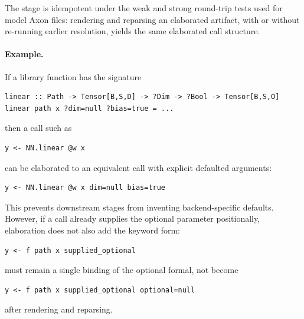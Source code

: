 The stage is idempotent under the weak and strong round-trip tests used for
model Axon files: rendering and reparsing an elaborated artifact, with or
without re-running earlier resolution, yields the same elaborated call
structure.

\paragraph{Example.}
If a library function has the signature
\begin{verbatim}
linear :: Path -> Tensor[B,S,D] -> ?Dim -> ?Bool -> Tensor[B,S,O]
linear path x ?dim=null ?bias=true = ...
\end{verbatim}
then a call such as
\begin{verbatim}
y <- NN.linear @w x
\end{verbatim}
can be elaborated to an equivalent call with explicit defaulted arguments:
\begin{verbatim}
y <- NN.linear @w x dim=null bias=true
\end{verbatim}
This prevents downstream stages from inventing backend-specific defaults.
However, if a call already supplies the optional parameter positionally,
elaboration does not also add the keyword form:
\begin{verbatim}
y <- f path x supplied_optional
\end{verbatim}
must remain a single binding of the optional formal, not become
\begin{verbatim}
y <- f path x supplied_optional optional=null
\end{verbatim}
after rendering and reparsing.
